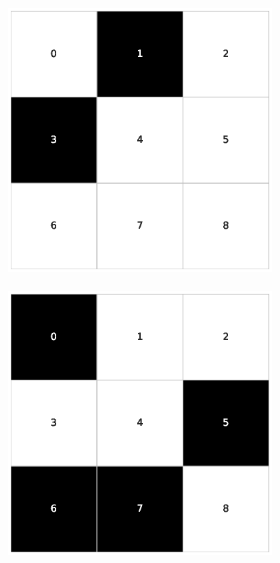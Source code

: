 \begin{figure}[h!]
    \centering
    \begin{subfigure}[b]{\textwidth}
        \centering
        \begin{subfigure}[b]{0.20\textwidth}
            \includegraphics[width=\columnwidth]{images/Tai9c_3x3_20.eps}
        \end{subfigure}
        \hspace{3em}
        \begin{subfigure}[b]{0.20\textwidth}
            \includegraphics[width=\columnwidth]{images/Tai9c_3x3_40.eps}

\end{subfigure}
\end{subfigure}
\end{figure}
